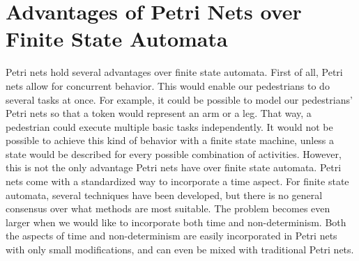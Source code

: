 \documentclass[11pt]{article}
\begin{document}
\section{Advantages of Petri Nets over Finite State Automata}
Petri nets hold several advantages over finite state automata. First of all, Petri nets allow for concurrent behavior. This would enable our pedestrians to do several tasks at once. For example, it could be possible to model our pedestrians' Petri nets so that a token would represent an arm or a leg. That way, a pedestrian could execute multiple basic tasks independently. It would not be possible to achieve this kind of behavior with a finite state machine, unless a state would be described for every possible combination of activities.
However, this is not the only advantage Petri nets have over finite state automata. Petri nets come with a standardized way to incorporate a time aspect. For finite state automata, several techniques have been developed, but there is no general consensus over what methods are most suitable. The problem becomes even larger when we would like to incorporate both time and non-determinism. Both the aspects of time and non-determinism are easily incorporated in Petri nets with only small modifications, and can even be mixed with traditional Petri nets. 

\begin{petrinet}

\end{petrinet}





\end{document}

